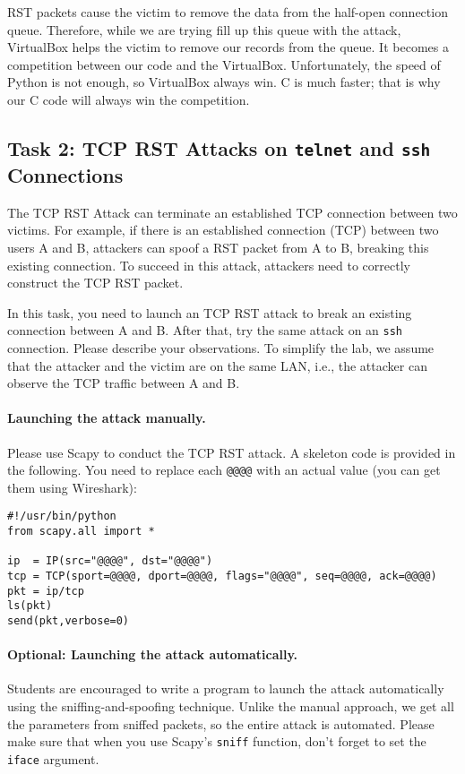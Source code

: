 RST packets cause the victim to remove the data from the half-open connection
queue. Therefore, while we are trying fill up this queue with the attack, 
VirtualBox helps the victim to remove our records from the queue. 
It becomes a competition between our code and the VirtualBox. 
Unfortunately, the speed of Python is not enough, so VirtualBox always win.
C is much faster; that is why our C code will always win the competition. 


\subsection {Task 2: TCP RST Attacks on \texttt{telnet} and 
             \texttt{ssh} Connections}

The TCP RST Attack can terminate an established TCP connection between
two victims. For example, if there is an established \telnet connection (TCP)
between two users A and B, attackers can spoof a RST packet from A to B,
breaking this existing connection. To succeed in this attack, attackers
need to correctly construct the TCP RST packet. 

In this task, you need to launch an TCP RST attack to break an existing 
\telnet connection between A and B. After that,
try the same attack on an {\tt ssh} connection. Please describe
your observations.  To simplify the lab,
we assume that the attacker and the victim are on the same LAN,
i.e., the attacker can observe the TCP traffic between
A and B.


\paragraph{Launching the attack manually.} 
Please use Scapy to conduct the TCP RST attack. 
A skeleton code is provided in the following. You need to replace each
\texttt{@@@@} with an actual value (you can get them using Wireshark):  


\begin{lstlisting}
#!/usr/bin/python
from scapy.all import *

ip  = IP(src="@@@@", dst="@@@@")
tcp = TCP(sport=@@@@, dport=@@@@, flags="@@@@", seq=@@@@, ack=@@@@)
pkt = ip/tcp
ls(pkt)
send(pkt,verbose=0)
\end{lstlisting}

\paragraph{Optional: Launching the attack automatically.} 
Students are encouraged to write a program to launch the 
attack automatically using the sniffing-and-spoofing technique. 
Unlike the manual approach, we get all the parameters
from sniffed packets, so the entire attack is automated.  
Please make sure that when you 
use Scapy's \texttt{sniff} function, don't forget to 
set the \texttt{iface} argument.  

